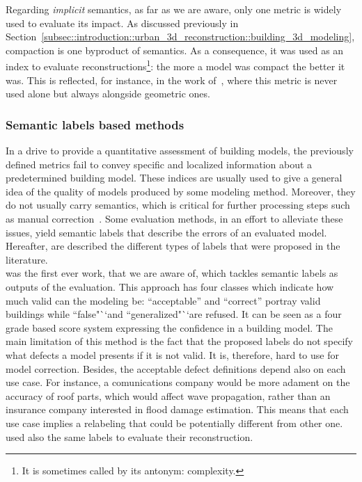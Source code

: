             Regarding \textit{implicit} semantics, as far as we are aware, only one metric is widely used to evaluate its impact.
            As discussed previously in Section~\ref{subsec::introduction::urban_3d_reconstruction::building_3d_modeling}, compaction is one byproduct of semantics.
            As a consequence, it was used as an index to evaluate reconstructions\footnote{It is sometimes called by its antonym: complexity.}: the more a model was compact the better it was.
            This is reflected, for instance, in the work of~\textcite{lafarge2012creating,duan_eccv16,zhang2017deep,zeng2018neural,zhu2018large}, where this metric is never used alone but always alongside geometric ones.

        \subsubsection{Semantic labels based methods}
            \label{subsec::state_of_the_art::quality::output::semantic}
            In a drive to provide a quantitative assessment of building models, the previously defined metrics fail to convey specific and localized information about a predetermined building model.
            These indices are usually used to give a general idea of the quality of models produced by some modeling method.
            Moreover, they do not usually carry semantics, which is critical for further processing steps such as manual correction~\parencite{elberink2011quality}.
            Some evaluation methods, in an effort to alleviate these issues, yield semantic labels that describe the errors of an evaluated model.
            Hereafter, are described the different types of labels that were proposed in the literature.\\

            \parencite{boudet2006supervised} was the first ever work, that we are aware of, which tackles semantic labels as outputs of the evaluation.
            This approach has four classes which indicate how much valid can the modeling be: ``acceptable'' and ``correct'' portray valid buildings while ``false"``and ``generalized"``are refused.
            It can be seen as a four grade based score system expressing the confidence in a building model.
            The main limitation of this method is the fact that the proposed labels do not specify what defects a model presents if it is not valid.
            It is, therefore, hard to use for model correction.
            Besides, the acceptable defect definitions depend also on each use case.
            For instance, a comunications company would be more adament on the accuracy of roof parts, which would affect wave propagation, rather than an insurance company interested in flood damage estimation.
            This means that each use case implies a relabeling that could be potentially different from other one.
            \textcite{durupt2006automatic} used also the same labels to evaluate their reconstruction.\\
            
